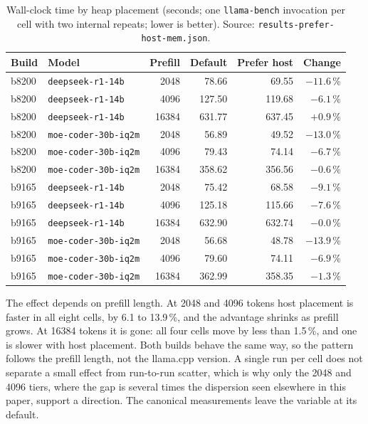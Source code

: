 \documentclass[11pt,a4paper]{article}
\begin{document}
\begin{table}[h]
\centering\small
\caption{Wall-clock time by heap placement (seconds; one
\texttt{llama-bench} invocation per cell with two internal repeats;
lower is better).  Source: \texttt{results-prefer-host-mem.json}.}
\label{tab:s-heap}
\begin{tabular}{@{}llrrrr@{}}
\toprule
\textbf{Build} & \textbf{Model} & \textbf{Prefill} & \textbf{Default} & \textbf{Prefer host} & \textbf{Change} \\
\midrule
b8200 & \texttt{deepseek-r1-14b}    &  2048 &  78.66 &  69.55 & $-11.6\,\%$ \\
b8200 & \texttt{deepseek-r1-14b}    &  4096 & 127.50 & 119.68 & $-6.1\,\%$ \\
b8200 & \texttt{deepseek-r1-14b}    & 16384 & 631.77 & 637.45 & $+0.9\,\%$ \\
b8200 & \texttt{moe-coder-30b-iq2m} &  2048 &  56.89 &  49.52 & $-13.0\,\%$ \\
b8200 & \texttt{moe-coder-30b-iq2m} &  4096 &  79.43 &  74.14 & $-6.7\,\%$ \\
b8200 & \texttt{moe-coder-30b-iq2m} & 16384 & 358.62 & 356.56 & $-0.6\,\%$ \\
\midrule
b9165 & \texttt{deepseek-r1-14b}    &  2048 &  75.42 &  68.58 & $-9.1\,\%$ \\
b9165 & \texttt{deepseek-r1-14b}    &  4096 & 125.18 & 115.66 & $-7.6\,\%$ \\
b9165 & \texttt{deepseek-r1-14b}    & 16384 & 632.90 & 632.74 & $-0.0\,\%$ \\
b9165 & \texttt{moe-coder-30b-iq2m} &  2048 &  56.68 &  48.78 & $-13.9\,\%$ \\
b9165 & \texttt{moe-coder-30b-iq2m} &  4096 &  79.60 &  74.11 & $-6.9\,\%$ \\
b9165 & \texttt{moe-coder-30b-iq2m} & 16384 & 362.99 & 358.35 & $-1.3\,\%$ \\
\bottomrule
\end{tabular}
\end{table}

The effect depends on prefill length.  At 2048 and 4096 tokens host
placement is faster in all eight cells, by 6.1 to 13.9\,\%, and the
advantage shrinks as prefill grows.  At 16384 tokens it is gone: all four
cells move by less than 1.5\,\%, and one is slower with host placement.
Both builds behave the same way, so the pattern follows the prefill
length, not the llama.cpp version.  A single run per cell does
not separate a small effect from run-to-run scatter, which is why only
the 2048 and 4096 tiers, where the gap is several times the dispersion
seen elsewhere in this paper, support a direction.  The canonical
measurements leave the variable at its default.
\end{document}
